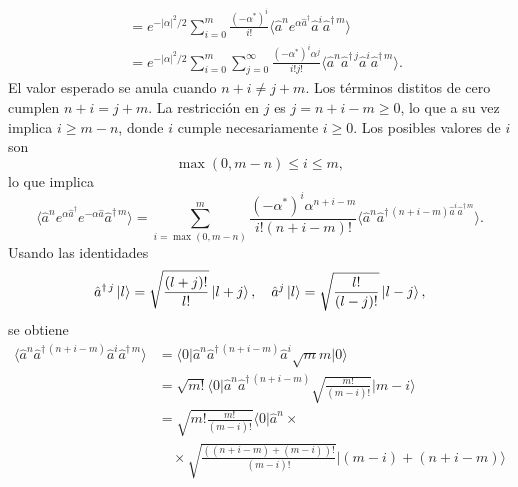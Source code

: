 \begin{enumerate}
\begin{align}
                                                                           & = e^{-|\alpha|^2/2}\sum_{i=0}^{m} \frac{(-\alpha^*)^{i}}{i!}\langle \hat{a}^{n} e^{\alpha \hat{a}^{\dagger}} \hat{a}^{i} \hat{a}^{\dagger\,m} \rangle                          \nonumber \\
                                                                           & = e^{-|\alpha|^2/2}\sum_{i=0}^{m} \sum_{j=0}^{\infty} \frac{(-\alpha^*)^{i} \alpha^{j}}{i!j!}\langle \hat{a}^{n} \hat{a}^{\dagger\,j} \hat{a}^{i} \hat{a}^{\dagger\,m} \rangle.
        \end{align}
        El valor esperado se anula cuando $n+i\neq j + m$. Los términos distitos de cero cumplen $n+i = j+m$. La restricción en $j$ es $j=n+i-m\geq0$, lo que a su vez implica $i\geq m-n$, donde $i$ cumple necesariamente $i\geq0$. Los posibles valores de $i$ son
        \begin{equation}
          \max(0, m-n)\leq i \leq m,
        \end{equation}
        lo que implica
        \begin{equation}
          \langle \hat{a}^{n} e^{\alpha\hat{a}^{\dagger}} e^{-\alpha \hat{a}} \hat{a}^{\dagger\,m} \rangle = \sum_{i=\max(0, m-n)}^{m}\frac{(-\alpha^{*})^{i}\alpha^{n+i-m}}{i! (n+i-m)!} \langle \hat{a}^{n} \hat{a}^{\dagger\,(n+i-m) \hat{a}^{i} \hat{a}^{\dagger\,m}} \rangle.
        \end{equation}
        Usando las identidades
        \begin{equation}
          \hat{a}^{\dagger\,j} \ket{l} = \sqrt{\frac{(l+j)!}{l!}} \ket{l+j}, \quad \hat{a}^{j}\ket{l}=\sqrt{\frac{l!}{(l-j)!}}\ket{l-j}, \label{eq:9-3}
        \end{equation}
        se obtiene
        \begin{align}
          \langle \hat{a}^{n} \hat{a}^{\dagger\,(n+i-m)} \hat{a}^{i} \hat{a}^{\dagger\,m} \rangle & = \langle 0 \vert \hat{a}^{n} \hat{a}^{\dagger\,(n+i-m)} \hat{a}^{i} \sqrt{m}{m}  \vert 0 \rangle                                            \nonumber \\
                                                                                                  & = \sqrt{m!} \langle 0 \vert \hat{a}^{n} \hat{a}^{\dagger\,(n+i-m)} \sqrt{\frac{m!}{(m-i)!}} \vert m-i \rangle                 \nonumber                \\
                                                                                                  & = \sqrt{m!\frac{m!}{(m-i)!}} \langle 0 \vert \hat{a}^{n}\times                                                                                         \\ & \quad \times \sqrt{\frac{((n+i-m) + (m-i))!}{(m-i)!}} \vert (m-i) + (n+i-m)\rangle\nonumber \\

\end{align}
\end{enumerate}
